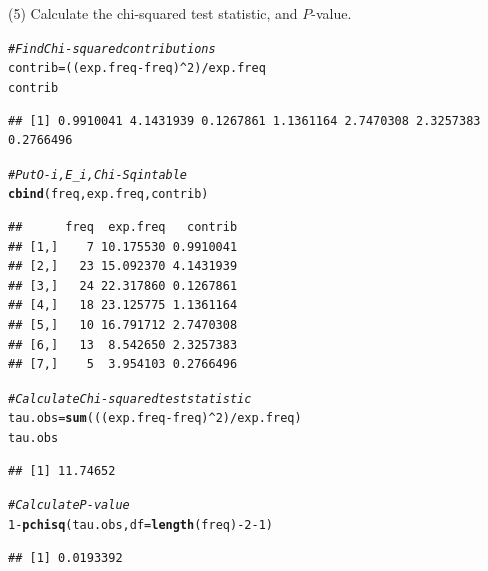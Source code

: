 \documentclass[t,xcolor=pdftex,dvipsnames,table]{beamer}
\makeatletter
\newcommand{\hlnum}[1]{\textcolor[rgb]{0.686,0.059,0.569}{#1}}%
\newcommand{\hlcom}[1]{\textcolor[rgb]{0.678,0.584,0.686}{\textit{#1}}}%
\newcommand{\hlopt}[1]{\textcolor[rgb]{0,0,0}{#1}}%
\newcommand{\hlstd}[1]{\textcolor[rgb]{0.345,0.345,0.345}{#1}}%
\newcommand{\hlkwb}[1]{\textcolor[rgb]{0.69,0.353,0.396}{#1}}%
\newcommand{\hlkwc}[1]{\textcolor[rgb]{0.333,0.667,0.333}{#1}}%
\newcommand{\hlkwd}[1]{\textcolor[rgb]{0.737,0.353,0.396}{\textbf{#1}}}%
\newenvironment{kframe}{%
 \def\at@end@of@kframe{}%
 \ifinner\ifhmode%
  \def\at@end@of@kframe{\end{minipage}}%
  \begin{minipage}{\columnwidth}%
 \fi\fi%
 \def\FrameCommand##1{\hskip\@totalleftmargin \hskip-\fboxsep
 \colorbox{shadecolor}{##1}\hskip-\fboxsep
     \hskip-\linewidth \hskip-\@totalleftmargin \hskip\columnwidth}%
 \MakeFramed {\advance\hsize-\width
   \@totalleftmargin\z@ \linewidth\hsize
   \@setminipage}}%
 {\par\unskip\endMakeFramed%
 \at@end@of@kframe}
\newenvironment{knitrout}{}{} %
\makeatother
\begin{document}
\begin{frame}[fragile]{}
(5) Calculate the chi-squared test statistic, and $P$-value.
\begin{knitrout}
\color{fgcolor}\begin{kframe}
\begin{alltt}
\hlcom{#Find Chi-squared contributions}
\hlstd{contrib} \hlkwb{=} \hlstd{((exp.freq}\hlopt{-}\hlstd{freq)}\hlopt{^}\hlnum{2}\hlstd{)}\hlopt{/}\hlstd{exp.freq}
\hlstd{contrib}
\end{alltt}
\begin{verbatim}
## [1] 0.9910041 4.1431939 0.1267861 1.1361164 2.7470308 2.3257383 0.2766496
\end{verbatim}
\begin{alltt}
\hlcom{# Put O-i, E_i, Chi-Sq in table}
\hlkwd{cbind}\hlstd{(freq,exp.freq,contrib)}
\end{alltt}
\begin{verbatim}
##      freq  exp.freq   contrib
## [1,]    7 10.175530 0.9910041
## [2,]   23 15.092370 4.1431939
## [3,]   24 22.317860 0.1267861
## [4,]   18 23.125775 1.1361164
## [5,]   10 16.791712 2.7470308
## [6,]   13  8.542650 2.3257383
## [7,]    5  3.954103 0.2766496
\end{verbatim}
\end{kframe}
\end{knitrout}
\end{frame}

\begin{frame}[fragile]{}
\begin{knitrout}
\color{fgcolor}\begin{kframe}
\begin{alltt}
\hlcom{#Calculate Chi-squared test statistic}
\hlstd{tau.obs}\hlkwb{=}\hlkwd{sum}\hlstd{(((exp.freq}\hlopt{-}\hlstd{freq)}\hlopt{^}\hlnum{2}\hlstd{)}\hlopt{/}\hlstd{exp.freq)}
\hlstd{tau.obs}
\end{alltt}
\begin{verbatim}
## [1] 11.74652
\end{verbatim}
\begin{alltt}
\hlcom{#Calculate P-value}
\hlnum{1}\hlopt{-}\hlkwd{pchisq}\hlstd{(tau.obs,} \hlkwc{df}\hlstd{=}\hlkwd{length}\hlstd{(freq)}\hlopt{-}\hlnum{2}\hlopt{-}\hlnum{1}\hlstd{)}
\end{alltt}
\begin{verbatim}
## [1] 0.0193392
\end{verbatim}
\end{kframe}
\end{knitrout}
\end{frame}
\end{document}

